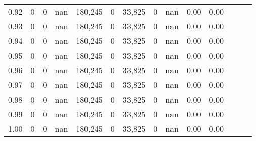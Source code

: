 \begin{tabular}{rrrrrrrrrrrrrr}
0.92 &      0 &      0 &   nan &  180,245 &        0 &  33,825 &       0 &   nan &  0.00 &      0.00 \\
0.93 &      0 &      0 &   nan &  180,245 &        0 &  33,825 &       0 &   nan &  0.00 &      0.00 \\
0.94 &      0 &      0 &   nan &  180,245 &        0 &  33,825 &       0 &   nan &  0.00 &      0.00 \\
0.95 &      0 &      0 &   nan &  180,245 &        0 &  33,825 &       0 &   nan &  0.00 &      0.00 \\
0.96 &      0 &      0 &   nan &  180,245 &        0 &  33,825 &       0 &   nan &  0.00 &      0.00 \\
0.97 &      0 &      0 &   nan &  180,245 &        0 &  33,825 &       0 &   nan &  0.00 &      0.00 \\
0.98 &      0 &      0 &   nan &  180,245 &        0 &  33,825 &       0 &   nan &  0.00 &      0.00 \\
0.99 &      0 &      0 &   nan &  180,245 &        0 &  33,825 &       0 &   nan &  0.00 &      0.00 \\
1.00 &      0 &      0 &   nan &  180,245 &        0 &  33,825 &       0 &   nan &  0.00 &      0.00 \\
\bottomrule
\end{tabular}
